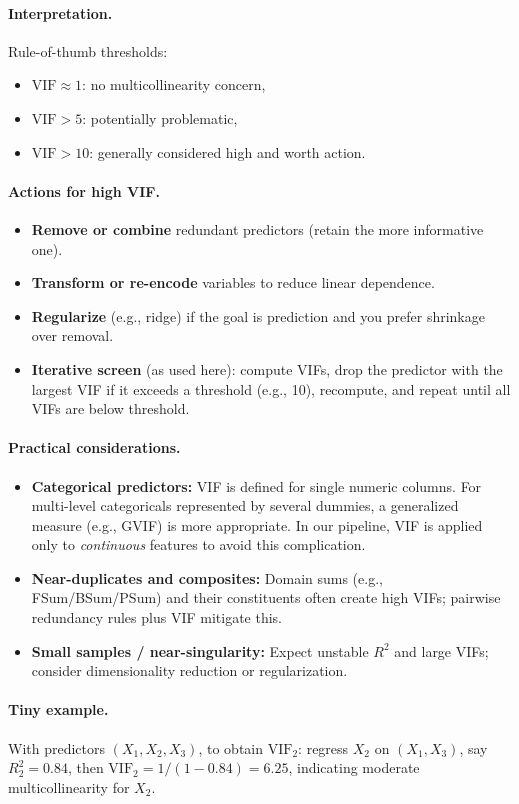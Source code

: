 \paragraph{Interpretation.}
Rule-of-thumb thresholds:
\begin{itemize}
  \item $\mathrm{VIF}\approx 1$: no multicollinearity concern,
  \item $\mathrm{VIF} > 5$: potentially problematic,
  \item $\mathrm{VIF} > 10$: generally considered high and worth action.
\end{itemize}

\paragraph{Actions for high VIF.}
\begin{itemize}
  \item \textbf{Remove or combine} redundant predictors (retain the more informative one).
  \item \textbf{Transform or re-encode} variables to reduce linear dependence.
  \item \textbf{Regularize} (e.g., ridge) if the goal is prediction and you prefer shrinkage over removal.
  \item \textbf{Iterative screen} (as used here): compute VIFs, drop the predictor with the largest VIF if it exceeds a threshold (e.g., 10), recompute, and repeat until all VIFs are below threshold.
\end{itemize}

\paragraph{Practical considerations.}
\begin{itemize}
  \item \textbf{Categorical predictors:} VIF is defined for single numeric columns. For multi-level categoricals represented by several dummies, a generalized measure (e.g., GVIF) is more appropriate. In our pipeline, VIF is applied only to \emph{continuous} features to avoid this complication.
  \item \textbf{Near-duplicates and composites:} Domain sums (e.g., FSum/BSum/PSum) and their constituents often create high VIFs; pairwise redundancy rules plus VIF mitigate this.
  \item \textbf{Small samples / near-singularity:} Expect unstable $R^2$ and large VIFs; consider dimensionality reduction or regularization.
\end{itemize}

\paragraph{Tiny example.}
With predictors $(X_1,X_2,X_3)$, to obtain $\mathrm{VIF}_2$: regress $X_2$ on $(X_1,X_3)$, say $R_2^2{=}0.84$, then $\mathrm{VIF}_2 = 1/(1-0.84)=6.25$, indicating moderate multicollinearity for $X_2$.
